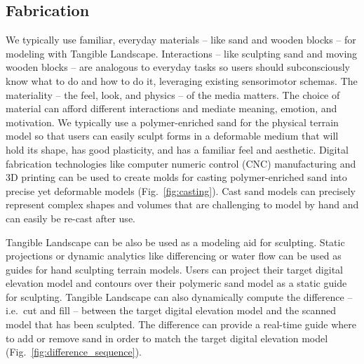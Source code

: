 \documentclass[prodmode,acmtochi]{acmsmall} %
\begin{document}
\subsection{Fabrication}
We typically use familiar, everyday materials 
-- like sand and wooden blocks -- 
for modeling with Tangible Landscape. 
Interactions -- like sculpting sand and moving wooden blocks -- 
are analogous to everyday tasks
so users should subconsciously know what to do and how to do it, 
leveraging existing sensorimotor schemas. 
The materiality -- the feel, look, and physics -- of the media matters. 
The choice of material can afford different interactions
and mediate meaning, emotion, and motivation. 
We typically use a polymer-enriched sand for the physical terrain model
so that users can easily sculpt forms in a deformable medium 
that will hold its shape, has good plasticity, and has a familiar feel and aesthetic. 
Digital fabrication technologies 
like computer numeric control (CNC) manufacturing and 3D printing
can be used to create molds for casting polymer-enriched sand 
into precise yet deformable models (Fig.~\ref{fig:casting}). 
Cast sand models can precisely represent complex shapes and volumes 
that are challenging to model by hand 
and can easily be re-cast after use.

Tangible Landscape can be also be used as a modeling aid for sculpting.
Static projections or dynamic analytics like differencing or water flow 
can be used as guides for hand sculpting terrain models. 
Users can project their target digital elevation model and contours 
over their polymeric sand model as a static guide for sculpting. 
Tangible Landscape can also dynamically compute the difference -- i.e.\ cut and fill --
between the target digital elevation model and the scanned model that has been sculpted. 
The difference can provide a real-time guide 
where to add or remove sand in order to match the target digital elevation model (Fig.~\ref{fig:difference_sequence}). 
\end{document}
